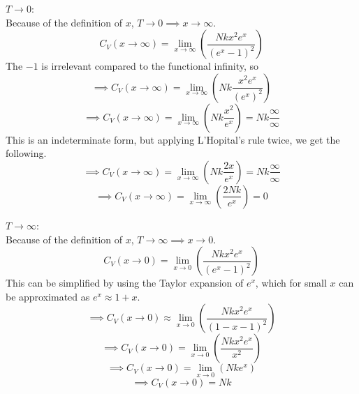 \documentclass[12pt]{article}
\begin{document}
\begin{flushleft}
$T\rightarrow0$:\\
Because of the definition of $x$, $T\rightarrow0\implies x\rightarrow\infty$.
$$C_V(x\rightarrow\infty)=\lim_{x\rightarrow\infty}\left(\frac{Nkx^2e^x}{(e^x-1)^2}\right)$$
The $-1$ is irrelevant compared to the functional infinity, so
$$\implies C_V(x\rightarrow\infty)=\lim_{x\rightarrow\infty}\left(Nk\frac{x^2e^x}{(e^x)^2}\right)$$
$$\implies C_V(x\rightarrow\infty)=\lim_{x\rightarrow\infty}\left(Nk\frac{x^2}{e^x}\right)=Nk\frac{\infty}{\infty}$$
This is an indeterminate form, but applying L'Hopital's rule twice, we get the following.
$$\implies C_V(x\rightarrow\infty)=\lim_{x\rightarrow\infty}\left(Nk\frac{2x}{e^x}\right)=Nk\frac{\infty}{\infty}$$
$$\implies C_V(x\rightarrow\infty)=\lim_{x\rightarrow\infty}\left(\frac{2Nk}{e^x}\right)=0$$

$T\rightarrow\infty$:\\
Because of the definition of $x$, $T\rightarrow\infty\implies x\rightarrow0$.
$$C_V(x\rightarrow0)=\lim_{x\rightarrow0}\left(\frac{Nkx^2e^x}{(e^x-1)^2}\right)$$
This can be simplified by using the Taylor expansion of $e^x$, which for small $x$ can be approximated as $e^x\approx1+x$.
$$\implies C_V(x\rightarrow0)\approx\lim_{x\rightarrow0}\left(\frac{Nkx^2e^x}{(1-x-1)^2}\right)$$
$$\implies C_V(x\rightarrow0)=\lim_{x\rightarrow0}\left(\frac{Nkx^2e^x}{x^2}\right)$$
$$\implies C_V(x\rightarrow0)=\lim_{x\rightarrow0}\left(Nke^x\right)$$
$$\implies C_V(x\rightarrow0)=Nk$$


\end{flushleft}
\end{document}

